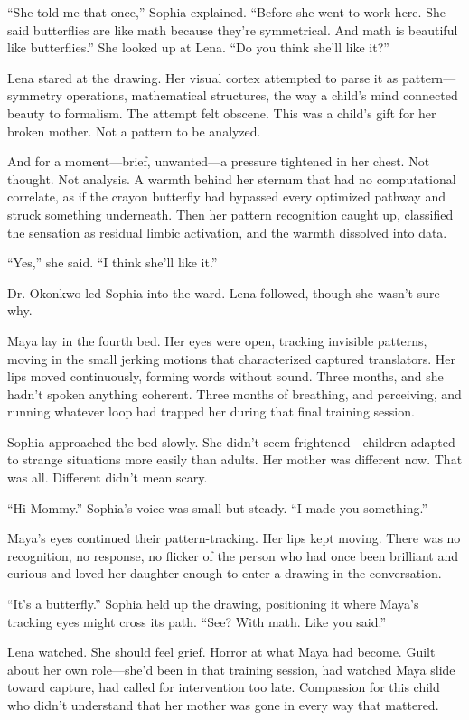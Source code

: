 ``She told me that once,'' Sophia explained. ``Before she went to work here. She said butterflies are like math because they're symmetrical. And math is beautiful like butterflies.'' She looked up at Lena. ``Do you think she'll like it?''

Lena stared at the drawing. Her visual cortex attempted to parse it as pattern—symmetry operations, mathematical structures, the way a child's mind connected beauty to formalism. The attempt felt obscene. This was a child's gift for her broken mother. Not a pattern to be analyzed.

And for a moment—brief, unwanted—a pressure tightened in her chest. Not thought. Not analysis. A warmth behind her sternum that had no computational correlate, as if the crayon butterfly had bypassed every optimized pathway and struck something underneath. Then her pattern recognition caught up, classified the sensation as residual limbic activation, and the warmth dissolved into data.

``Yes,'' she said. ``I think she'll like it.''

Dr. Okonkwo led Sophia into the ward. Lena followed, though she wasn't sure why.

Maya lay in the fourth bed. Her eyes were open, tracking invisible patterns, moving in the small jerking motions that characterized captured translators. Her lips moved continuously, forming words without sound. Three months, and she hadn't spoken anything coherent. Three months of breathing, and perceiving, and running whatever loop had trapped her during that final training session.

Sophia approached the bed slowly. She didn't seem frightened—children adapted to strange situations more easily than adults. Her mother was different now. That was all. Different didn't mean scary.

``Hi Mommy.'' Sophia's voice was small but steady. ``I made you something.''

Maya's eyes continued their pattern-tracking. Her lips kept moving. There was no recognition, no response, no flicker of the person who had once been brilliant and curious and loved her daughter enough to enter a drawing in the conversation.

``It's a butterfly.'' Sophia held up the drawing, positioning it where Maya's tracking eyes might cross its path. ``See? With math. Like you said.''

Lena watched. She should feel grief. Horror at what Maya had become. Guilt about her own role—she'd been in that training session, had watched Maya slide toward capture, had called for intervention too late. Compassion for this child who didn't understand that her mother was gone in every way that mattered.

